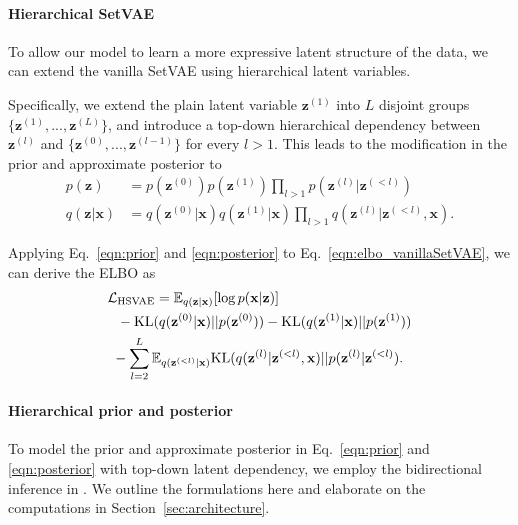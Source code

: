 \documentclass[final]{arxiv/cvpr}
\newcommand{\cutparagraphup}{\vspace*{-0.1in}}
\begin{document}
\cutparagraphup
\paragraph{Hierarchical SetVAE}
To allow our model to learn a more expressive latent structure of the data, we can extend the vanilla SetVAE using hierarchical latent variables.

Specifically, we extend the plain latent variable $\mathbf{z}^{(1)}$ into $L$ disjoint groups $\{\mathbf{z}^{(1)}, ..., \mathbf{z}^{(L)}\}$, and introduce a top-down hierarchical dependency between $\mathbf{z}^{(l)}$ and $\{\mathbf{z}^{(0)}, ..., \mathbf{z}^{(l-1)}\}$ for every $l>1$. 
This leads to the modification in the prior and approximate posterior to
\begin{align}
    p(\mathbf{z}) &= p(\mathbf{z}^{(0)}) p(\mathbf{z}^{(1)}) \prod_{l>1} {p(\mathbf{z}^{(l)}|\mathbf{z}^{(<l)})}\label{eqn:prior}\\
    q(\mathbf{z}|\mathbf{x}) &= q(\mathbf{z}^{(0)}|\mathbf{x}) q(\mathbf{z}^{(1)}|\mathbf{x}) \prod_{l>1} {q(\mathbf{z}^{(l)}|\mathbf{z}^{(<l)}, \mathbf{x})}. \label{eqn:posterior}
\end{align}

Applying Eq.~\eqref{eqn:prior} and \eqref{eqn:posterior} to Eq.~\eqref{eqn:elbo_vanillaSetVAE}, we can derive the ELBO as
\begin{align}
    &\mathcal{L}_{\text{HSVAE}} = \mathbb{E}_{q(\mathbf{z}|\mathbf{x})}{\left[ \log p(\mathbf{x}|\mathbf{z}) \right]} \nonumber\\
    &~~- \textnormal{KL}(q(\mathbf{z}^{(0)}|\mathbf{x})||p(\mathbf{z}^{(0)})) - \textnormal{KL}(q(\mathbf{z}^{(1)}|\mathbf{x})||p(\mathbf{z}^{(1)})) \nonumber\\
    &~- \sum_{l=2}^L{\mathbb{E}_{q(\mathbf{z}^{(<l)}|\mathbf{x})}{\textnormal{KL}(q(\mathbf{z}^{(l)}|\mathbf{z}^{(<l)}, \mathbf{x})||p(\mathbf{z}^{(l)}|\mathbf{z}^{(<l)})}}.
    \label{eqn:elbo_hierarchicalSetVAE}
\end{align}

\cutparagraphup
\paragraph{Hierarchical prior and posterior}
To model the prior and approximate posterior in Eq.~\eqref{eqn:prior} and \eqref{eqn:posterior} with top-down latent dependency, we employ the bidirectional inference in \cite{sonderby2016ladder}.
We outline the formulations here and elaborate on the computations in Section~\ref{sec:architecture}. 
\end{document}
